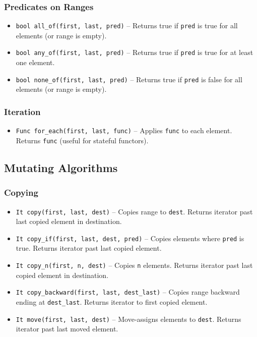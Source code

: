 \subsubsection{Predicates on Ranges}
\begin{itemize}
\item \texttt{bool all\_of(first, last, pred)} -- Returns true if \texttt{pred} is true for all elements (or range is empty).
\item \texttt{bool any\_of(first, last, pred)} -- Returns true if \texttt{pred} is true for at least one element.
\item \texttt{bool none\_of(first, last, pred)} -- Returns true if \texttt{pred} is false for all elements (or range is empty).
\end{itemize}

\subsubsection{Iteration}
\begin{itemize}
\item \texttt{Func for\_each(first, last, func)} -- Applies \texttt{func} to each element. Returns \texttt{func} (useful for stateful functors).
\end{itemize}

\subsection{Mutating Algorithms}

\subsubsection{Copying}
\begin{itemize}
\item \texttt{It copy(first, last, dest)} -- Copies range to \texttt{dest}. Returns iterator past last copied element in destination.
\item \texttt{It copy\_if(first, last, dest, pred)} -- Copies elements where \texttt{pred} is true. Returns iterator past last copied element.
\item \texttt{It copy\_n(first, n, dest)} -- Copies \texttt{n} elements. Returns iterator past last copied element in destination.
\item \texttt{It copy\_backward(first, last, dest\_last)} -- Copies range backward ending at \texttt{dest\_last}. Returns iterator to first copied element.
\item \texttt{It move(first, last, dest)} -- Move-assigns elements to \texttt{dest}. Returns iterator past last moved element.
\end{itemize}

